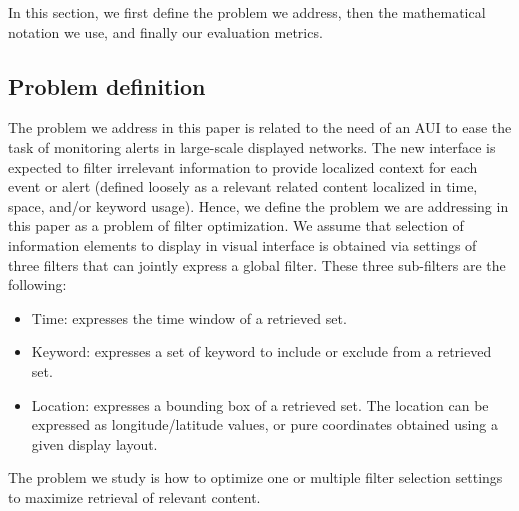 In this section, we first define the problem we address, then the mathematical notation we use, and finally our  evaluation metrics.



\subsection{Problem definition}

The problem we address in this paper is related to the need of an AUI 
to ease the task of monitoring alerts in
large-scale displayed networks. The new interface is expected
to filter irrelevant information to provide localized context for
each event or alert (defined loosely as a relevant related content localized in time, space, and/or keyword usage). Hence, we define the problem we are addressing in this
paper as a problem of filter optimization.
We assume that selection of information elements to display in visual interface is obtained via settings of three filters that can jointly express a global filter. These three sub-filters are the following:


\begin{itemize}
\item Time: expresses the time window of a retrieved set. 
\item Keyword: expresses a set of keyword to include or exclude from a retrieved set.
\item Location: expresses a bounding box of a retrieved set. The location can be expressed as longitude/latitude values, or pure coordinates obtained using a given display layout. 
\end{itemize}

The problem we study is how to optimize one or multiple filter selection settings to maximize retrieval of relevant content. 

